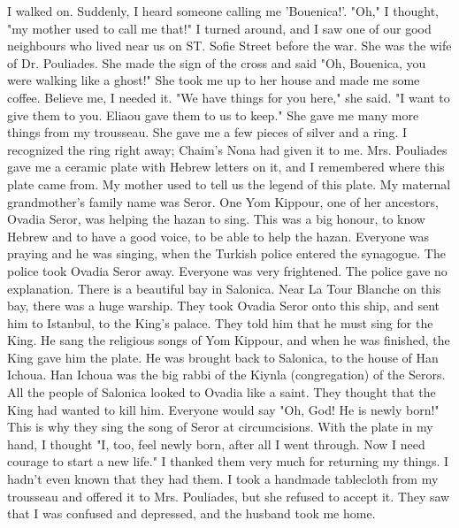 I walked on.
Suddenly, I heard someone calling me 'Bouenica!’.
"Oh," I thought, "my mother used to call me that!"
I turned around, 
and I saw one of our good neighbours who lived near us on ST.
Sofie 
Street before the war.
She was the wife of Dr.
Pouliades.
She made the 
sign of the cross and said "Oh, Bouenica, you were walking like a 
ghost!"
She took me up to her house and made me some coffee.
Believe 
me, I needed it.
"We have things for you here," she said.
"I want to give them to
you.
Eliaou gave them to us to keep."
She gave me many more things 
from my trousseau.
She gave me a few pieces of silver and a ring.
I 
recognized the ring right away; Chaim's Nona had given it to me.
Mrs.
Pouliades gave me a ceramic plate with Hebrew letters on it, and I remembered where this plate came from.
My mother used to tell us the legend of this plate.
My maternal 
grandmother's family name was Seror.
One Yom Kippour, one of her 
ancestors, Ovadia Seror, was helping the hazan to sing.
This was a big 
honour, to know Hebrew and to have a good voice, to be able to help the 
hazan.
Everyone was praying and he was singing, when the Turkish police entered the synagogue.
The police took Ovadia Seror away.
Everyone was very frightened.
The police gave no explanation.
There is a 
beautiful bay in Salonica.
Near La Tour Blanche on this bay, there 
was a huge warship.
They took Ovadia Seror onto this ship, and sent 
him to Istanbul, to the King’s palace.
They told him that he must sing 
for the King.
He sang the religious songs of Yom Kippour, and when he 
was finished, the King gave him the plate.
He was brought back to Salonica, to the house of Han Ichoua.
Han Ichoua was the big rabbi of 
the Kiynla (congregation) of the Serors.
All the people of Salonica 
looked to Ovadia like a saint.
They thought that the King had wanted 
to kill him.
Everyone would say "Oh, God!
He is newly born!"
This 
is why they sing the song of Seror at circumcisions.
With the plate in my hand, I thought "I, too, feel newly born, after all I went through.
Now I need courage to start a new life."
I 
thanked them very much for returning my things.
I hadn't even known 
that they had them.
I took a handmade tablecloth from my trousseau and 
offered it to Mrs.
Pouliades, but she refused to accept it.
They saw 
that I was confused and depressed, and the husband took me home.